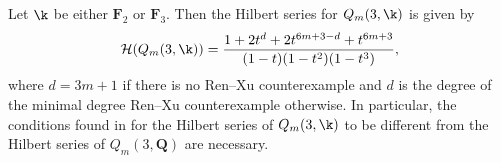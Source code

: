 \begin{Theorem}\label{thm:1}
 Let $\k$ be either $\mathbf{F}_2$ or $\mathbf{F}_3$. Then the Hilbert series for $Q_m(3,\k)$ is given by
 \[\mathcal{H}(Q_m(3,\k))=\frac{1+2t^d+2t^{6m+3-d}+t^{6m+3}}{(1-t)(1-t^2)(1-t^3)},\]
 where $d=3m+1$ if there is no Ren--Xu counterexample and $d$ is the degree of the minimal degree Ren--Xu counterexample otherwise. In particular, the conditions found in {\rm \cite{Ren_2020}} for the Hilbert series of $Q_m(3,\k)$ to be different from the Hilbert series of $Q_m(3,\mathbf{Q})$ are necessary.
\end{Theorem}
